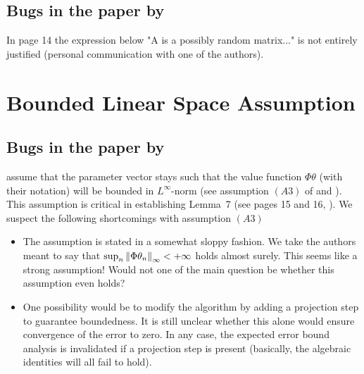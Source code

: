 \documentclass{article}
\begin{document}
\subsection{Bugs in the paper by  \cite{lstdicmla}}
In page 14 the expression below "A is a possibly random matrix..." is not entirely justified (personal communication with one of the authors). 

\section{Bounded Linear Space Assumption}
\subsection{Bugs in the paper by \citet{flstda}}
\citet{flstda} assume that the parameter vector stays such that the value function $\Phi \theta$ (with their notation) will be bounded in $L^\infty$-norm (see assumption \textbf{$(A3)$} of \cite{flstd} and \cite{flstda}). This assumption is critical in establishing Lemma~7 (see pages 15 and 16, \cite{flstda}).
We suspect the following shortcomings with assumption \textbf{$(A3)$}
\begin{itemize}
\item The assumption is stated in a somewhat sloppy fashion. We take the authors meant to say that $\sup_n \left\| \Phi \theta_n\right\|_\infty<+\infty$ holds almost surely. This seems like a strong assumption! Would not one of the main question be whether this assumption even holds?
\item One possibility would be to modify the algorithm by adding a projection step to guarantee boundedness.
It is still unclear  whether this alone would ensure convergence of the error to zero. In any case, the expected error bound analysis is invalidated if a projection step is present (basically, the algebraic identities will all fail to hold).

\end{itemize}
\end{document}
